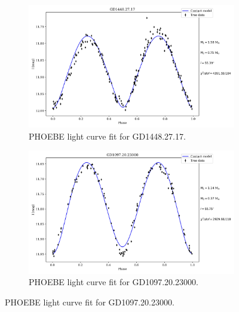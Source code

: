 \documentclass{pracalicmgr}
\begin{document}
\begin{appendices}
\begin{figure}[H]
   \end{figure}
    \begin{figure}[H]
        \centering
        \begin{adjustwidth}{-0.5in}{-0.5in}
        \begin{subfigure}{0.6\textwidth}
            \centering
            \includegraphics[width=1\textwidth]{plots/modeling_phoebe_contact_GD1448.27.17.jpg}
            \caption{PHOEBE light curve fit for GD1448.27.17.}
        \end{subfigure}
        \begin{subfigure}{0.6\textwidth}
            \centering
            \includegraphics[width=1\textwidth]{plots/modeling_phoebe_contact_GD1097.20.23000.jpg}
            \caption{PHOEBE light curve fit for GD1097.20.23000. }
        \end{subfigure}
        \end{adjustwidth}
   \end{figure}
   \begin{figure}[H]

\end{figure}
\end{appendices}
\end{document}
